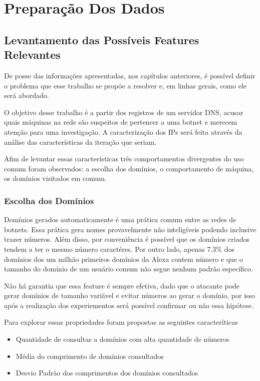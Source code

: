 \chapter{Preparação Dos Dados}

\section{Levantamento das Possíveis Features Relevantes}
De posse das informações apresentadas, nos capítulos anteriores, é possível definir o problema que esse trabalho se propõe a resolver e, em linhas gerais, como ele será abordado.

O objetivo desse trabalho é a partir dos registros de um servidor DNS, acusar quais máquinas na rede são suspeitos de pertencer a uma botnet e merecem atenção para uma investigação. A caracterização dos IPs será feita através da análise das características da iteração que seriam.

Afim de levantar essas características três comportamentos divergentes do uso comum foram observados: a escolha dos domínios, o comportamento de máquina, os domínios visitados em comum.

\subsection{Escolha dos Domínios}
Domínios gerados automaticamente é uma prática comum entre as redes de botnets. Essa prática gera nomes provavelmente não inteligíveis podendo inclusive trazer números. Além disso, por conveniência é possível que os domínios criados tendem a ter o mesmo número caractéres. Por outro lado, apenas 7.3\% dos domínios dos um milhão primeiros domínios da Alexa contem número e que o tamanho do domínio de um usuário comum não segue nenhum padrão específico.

Não há garantia que essa feature é sempre efetiva, dado que o atacante pode gerar domínios de tamanho variável e evitar números ao gerar o domínio, por isso após a realização dos experiementos será possível confirmar ou não essa hipótese.

Para explorar essas propriedades foram propostas as seguintes caracteríticas

\begin{itemize}
\item Quantidade de consultas a domínios com alta quantidade de números
\item Média do comprimento de domínios consultados
\item Desvio Padrão dos comprimentos dos domínios consultados
\end{itemize}

